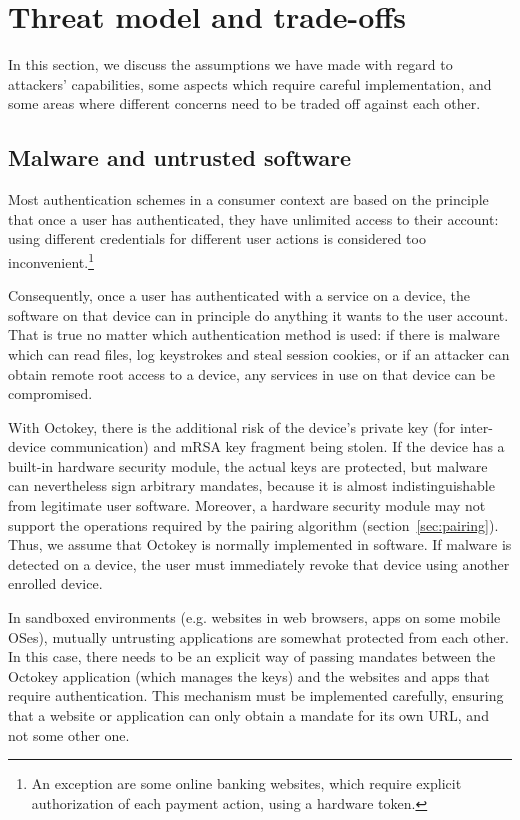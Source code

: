 \section{Threat model and trade-offs}\label{sec:threat}

In this section, we discuss the assumptions we have made with regard to attackers' capabilities,
some aspects which require careful implementation, and some areas where different concerns need to
be traded off against each other.

\subsection{Malware and untrusted software}\label{sec:malware}

Most authentication schemes in a consumer context are based on the principle that once a user has
authenticated, they have unlimited access to their account: using different credentials for
different user actions is considered too inconvenient.\footnote{An exception are some online banking
websites, which require explicit authorization of each payment action, using a hardware token.}

Consequently, once a user has authenticated with a service on a device, the software on that device
can in principle do anything it wants to the user account. That is true no matter which
authentication method is used: if there is malware which can read files, log keystrokes and steal
session cookies, or if an attacker can obtain remote root access to a device, any services in use on
that device can be compromised.

With Octokey, there is the additional risk of the device's private key (for inter-device
communication) and mRSA key fragment being stolen. If the device has a built-in hardware security
module, the actual keys are protected, but malware can nevertheless sign arbitrary mandates, because
it is almost indistinguishable from legitimate user software. Moreover, a hardware security module
may not support the operations required by the pairing algorithm (section~\ref{sec:pairing}). Thus,
we assume that Octokey is normally implemented in software. If malware is detected on a device, the
user must immediately revoke that device using another enrolled device.

In sandboxed environments (e.g. websites in web browsers, apps on some mobile OSes), mutually
untrusting applications are somewhat protected from each other. In this case, there needs to be an
explicit way of passing mandates between the Octokey application (which manages the keys) and the
websites and apps that require authentication. This mechanism must be implemented carefully,
ensuring that a website or application can only obtain a mandate for its own URL, and not some other
one.

